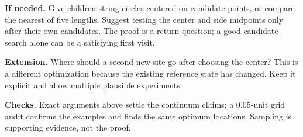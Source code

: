 \documentclass[11pt]{article}
\begin{document}
\textbf{If needed.} Give children string circles centered on candidate points, or compare the nearest of five lengths. Suggest testing the center and side midpoints only after their own candidates. The proof is a return question; a good candidate search alone can be a satisfying first visit.

\textbf{Extension.} Where should a second new site go after choosing the center? This is a different optimization because the existing reference state has changed. Keep it explicit and allow multiple plausible experiments.

\textbf{Checks.} Exact arguments above settle the continuum claims; a 0.05-unit grid audit confirms the examples and finds the same optimum locations. Sampling is supporting evidence, not the proof.
\end{document}
